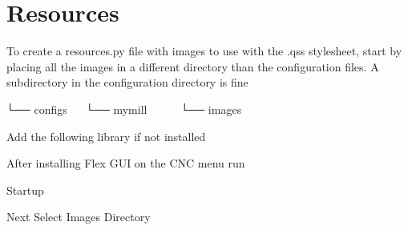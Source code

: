 \documentclass[letterpaper,10pt,english]{sphinxmanual}
\begin{document}
\begin{sphinxVerbatim}[commandchars=\\\{\}]
\end{sphinxVerbatim}

\sphinxstepscope


\chapter{Resources}
\label{\detokenize{resources:resources}}\label{\detokenize{resources::doc}}
\sphinxAtStartPar
To create a resources.py file with images to use with the .qss stylesheet, start
by placing all the images in a different directory than the configuration files.
A subdirectory in the configuration directory is fine

\begin{sphinxVerbatim}[commandchars=\\\{\}]
└── configs
   └── my\PYGZus{}mill
       └── images
\end{sphinxVerbatim}

\sphinxAtStartPar
Add the following library if not installed

\begin{sphinxVerbatim}[commandchars=\\\{\}]
   
\end{sphinxVerbatim}

\sphinxAtStartPar
After installing Flex GUI on the CNC menu run 


\sphinxAtStartPar
Startup


\sphinxAtStartPar
Next Select Images Directory
\end{document}
